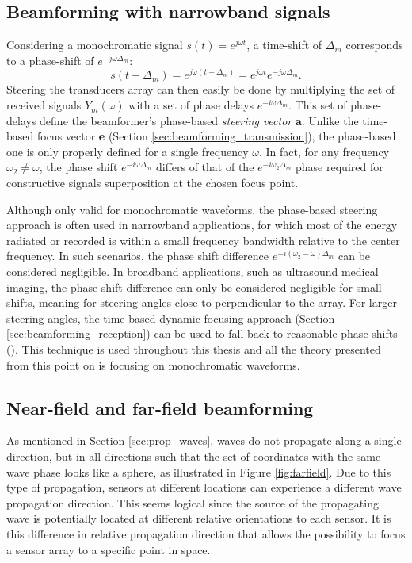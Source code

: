 \subsection{Beamforming with narrowband signals}
\label{sec:beamforming_frequency}
Considering a monochromatic signal $s(t) = e^{j \omega t}$, a time-shift of $\Delta_m$ corresponds to a phase-shift of $e^{-j \omega \Delta_m}$:
\begin{equation}
    s(t - \Delta_m) = e^{j \omega (t - \Delta_m)} = e^{j \omega t} e^{-j \omega \Delta_m}.
\end{equation}
\noindent
Steering the transducers array can then easily be done by multiplying the set of received signals $Y_m(\omega)$ with a set of phase delays $e^{-i \omega \Delta_m}$. This set of phase-delays define the beamformer's phase-based \textit{steering vector} \textbf{a}.
Unlike the time-based focus vector \textbf{e} (Section \ref{sec:beamforming_transmission}), the phase-based one is only properly defined for a single frequency $\omega$. In fact, for any frequency $\omega_2 \neq \omega$, the phase shift $e^{-i \omega \Delta_m}$ differs of that of the $e^{-i \omega_2 \Delta_m}$ phase required for constructive signals superposition at the chosen focus point.

Although only valid for monochromatic waveforms, the phase-based steering approach is often used in narrowband applications, for which most of the energy radiated or recorded is within a small frequency bandwidth relative to the center frequency. In such scenarios, the phase shift difference $e^{-i (\omega_2 - \omega) \Delta_m}$ can be considered negligible.
In broadband applications, such as ultrasound medical imaging, the phase shift difference can only be considered negligible for small shifts, meaning for steering angles close to perpendicular to the array. For larger steering angles, the time-based dynamic focusing approach (Section \ref{sec:beamforming_reception}) can be used to fall back to reasonable phase shifts (\cite{Jensen_multibeam}). This technique is used throughout this thesis and all the theory presented from this point on is focusing on monochromatic waveforms.


\subsection{Near-field and far-field beamforming}
\label{sec:nearfield_farfield}
As mentioned in Section \ref{sec:prop_waves}, waves do not propagate along a single direction, but in all directions such that the set of coordinates with the same wave phase looks like a sphere, as illustrated in Figure \ref{fig:farfield}. Due to this type of propagation, sensors at different locations can experience a different wave propagation direction. This seems logical since the source of the propagating wave is potentially located at different relative orientations to each sensor. It is this difference in relative propagation direction that allows the possibility to focus a sensor array to a specific point in space.

